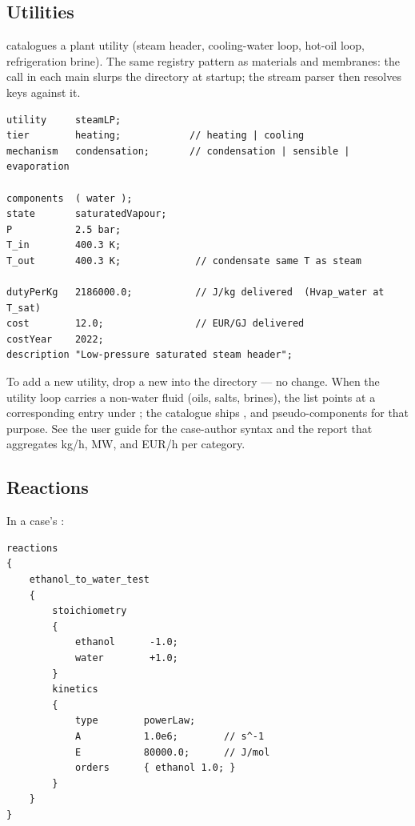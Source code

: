 \documentclass[11pt,a4paper]{article}
\begin{document}
\subsection{Utilities}

 catalogues a plant utility
(steam header, cooling-water loop, hot-oil loop, refrigeration brine).
The same registry pattern as materials and membranes: the
 call in each main slurps
the directory at startup; the stream parser then resolves
 keys against it.

\begin{lstlisting}[language=dict]
utility     steamLP;
tier        heating;            // heating | cooling
mechanism   condensation;       // condensation | sensible | evaporation

components  ( water );
state       saturatedVapour;
P           2.5 bar;
T_in        400.3 K;
T_out       400.3 K;             // condensate same T as steam

dutyPerKg   2186000.0;           // J/kg delivered  (Hvap_water at T_sat)
cost        12.0;                // EUR/GJ delivered
costYear    2022;
description "Low-pressure saturated steam header";
\end{lstlisting}

To add a new utility, drop a new  into the directory --- no
\cpp{} change.  When the utility loop carries a non-water fluid (oils,
salts, brines), the  list points at a corresponding
entry under ; the catalogue ships
,  and 
pseudo-components for that purpose.  See the user guide for the
case-author syntax  and the 
report that aggregates kg/h, MW, and EUR/h per category.

\subsection{Reactions}

In a case's :

\begin{lstlisting}[language=dict]
reactions
{
    ethanol_to_water_test
    {
        stoichiometry
        {
            ethanol      -1.0;
            water        +1.0;
        }
        kinetics
        {
            type        powerLaw;
            A           1.0e6;        // s^-1
            E           80000.0;      // J/mol
            orders      { ethanol 1.0; }
        }
    }
}
\end{lstlisting}
\end{document}
